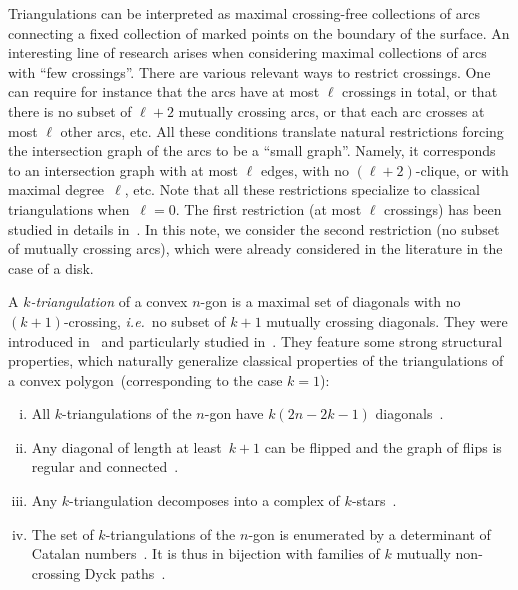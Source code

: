 \documentclass{amsart}
\theoremstyle{remark}
\newcommand{\darkblue}{\color{darkblue}} %
\newcommand{\defn}[1]{\textsl{\darkblue #1}} %
\newcommand{\ie}{\textit{i.e.}~} %
\begin{document}
Triangulations can be interpreted as maximal crossing-free collections of arcs connecting a fixed collection of marked points on the boundary of the surface.
An interesting line of research arises when considering maximal collections of arcs with ``few crossings''.
There are various relevant ways to restrict crossings.
One can require for instance that the arcs have at most $\ell$ crossings in total, or that there is no subset of $\ell+2$ mutually crossing arcs, or that each arc crosses at most $\ell$ other arcs, etc.
All these conditions translate natural restrictions forcing the intersection graph of the arcs to be a ``small graph''.
Namely, it corresponds to an intersection graph with at most $\ell$ edges, with no $(\ell+2)$-clique, or with maximal degree~$\ell$, etc.
Note that all these restrictions specialize to classical triangulations when~$\ell = 0$.
The first restriction (at most $\ell$ crossings) has been studied in details in~\cite{PilaudRue}.
In this note, we consider the second restriction (no subset of mutually crossing arcs), which were already considered in the literature in the case of a disk.

A \defn{$k$-triangulation} of a convex $n$-gon is a maximal set of diagonals with no $(k+1)$-crossing, \ie no subset of $k+1$ mutually crossing diagonals.
They were introduced in~\cite{CapoyleasPach} and particularly studied in~\cite{Nakamigawa, DressKoolenMoulton, Jonsson1, Jonsson2, SerranoStump, PilaudSantos-multitriangulations}.
They feature some strong structural properties, which naturally generalize classical properties of the triangulations of a convex polygon~(corresponding to the case $k=1$):
\begin{enumerate}[(i)]
\item All $k$-triangulations of the $n$-gon have $k(2n-2k-1)$ diagonals~\cite{CapoyleasPach, Nakamigawa, DressKoolenMoulton}.
\item Any diagonal of length at least~$k + 1$ can be flipped and the graph of flips is regular and connected~\cite{Nakamigawa, DressKoolenMoulton}.
\item Any $k$-triangulation decomposes into a complex of $k$-stars~\cite{PilaudSantos-multitriangulations}.
\item The set of $k$-triangulations of the $n$-gon is enumerated by a determinant of Catalan numbers~\cite{Jonsson1, Jonsson2}. It is thus in bijection with families of $k$ mutually non-crossing Dyck paths~\cite{SerranoStump}.
\end{enumerate}
\end{document}
